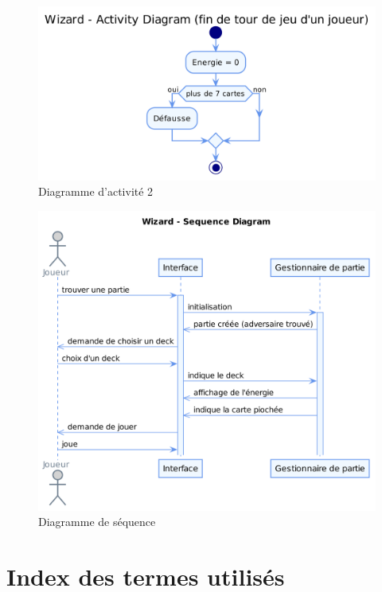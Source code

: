 \documentclass[11pt,a4paper]{article}
\begin{document}
\begin{figure}[ht]
  \centering
  \includegraphics[width=1\textwidth]{uml_files/ActivityDiagram2.png}
  \caption{\label{fig:class} Diagramme d'activité 2}
\end{figure}

\begin{figure}[ht]
  \centering
  \includegraphics[width=1\textwidth]{uml_files/SequenceDiagram.png}
  \caption{\label{fig:class} Diagramme de séquence}
\end{figure}

\appendix

\section{Index des termes utilisés}
\label{sec:index}
\end{document}
